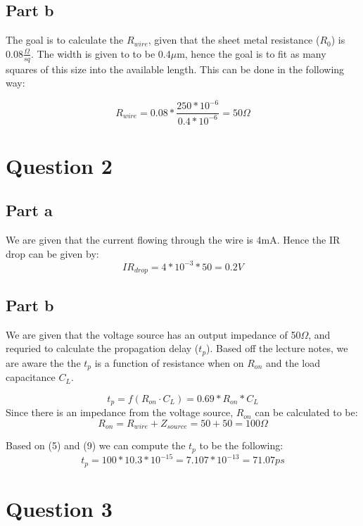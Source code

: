 \documentclass{article}
\begin{document}
\subsection*{Part b}
The goal is to calculate the $R_{wire}$, given that the sheet metal resistance ($R_{0}$) is 0.08$\frac{\Omega}{sq}$.
The width is given to to be 0.4$\mu$m, hence the goal is to fit as many squares of this size into the available length.
This can be done in the following way:

\begin{equation}
    R_{wire} = 0.08 * \frac{250 * 10^{-6}}{0.4 * 10^{-6}} = 50\Omega
\end{equation}

\section*{Question 2}
\subsection*{Part a}
We are given that the current flowing through the wire is 4mA. Hence the IR drop can be given by:
\begin{equation}
    IR_{drop} = 4 * 10^{-3} * 50 = 0.2 V
\end{equation}

\subsection*{Part b}
We are given that the voltage source has an output impedance of 50$\Omega$, and requried to calculate the propagation delay ($t_{p}$).
Based off the lecture notes, we are aware the the $t_{p}$ is a function of resistance when on $R_{on}$ and the load capacitance $C_{L}$.

\begin{equation}
    t_{p} = f(R_{on} \cdot C_{L}) = 0.69 * R_{on} * C_{L}
\end{equation}
Since there is an impedance from the voltage source, $R_{on}$ can be calculated to be:
\begin{equation}
    R_{on} = R_{wire} + Z_{source} = 50 + 50 = 100\Omega
\end{equation}

Based on (5) and (9) we can compute the $t_{p}$ to be the following:
\begin{equation}
    t_{p} = 100 * 10.3 * 10^{-15} = 7.107 * 10^{-13} = 71.07ps
\end{equation}

\section*{Question 3}
\end{document}
